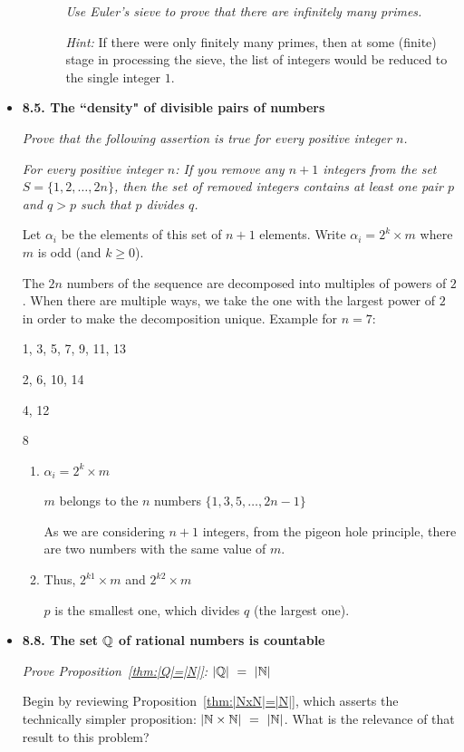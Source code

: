 \begin{itemize}
\begin{itemize}
\begin{enumerate}
\bigskip

{\em Use Euler's sieve to prove that there are infinitely many primes.}
\medskip

{\em Hint:} If there were only finitely many primes, then at some (finite) stage in processing the sieve, the list of integers would be reduced to the single integer $1$.
\end{enumerate}
\end{itemize}

 \medskip\item

{\bf 8.5. The ``density"  of divisible pairs of numbers}

{\em Prove that the following assertion is true for every positive integer $n$.}
\medskip

{\em 
For every positive integer $n$:  If you remove {\em any} $n+1$ integers from the set $S = \{ 1, 2, \ldots, 2n\}$, then the set of removed integers contains at least one pair $p$ and $q > p$ such that $p$ divides $q$.
}


\smallskip

Let $\alpha_i$ be the elements of this set of $n+1$ elements.
Write $\alpha_i = 2^k \times m$ where $m$ is odd (and $k \geq 0$).

The $2n$ numbers of the sequence are decomposed into multiples of powers of $2$.
When there are multiple ways, we take the one with the largest power of $2$ in order to make the decomposition unique.
Example for $n=7$:

1, 3, 5, 7, 9, 11, 13

2, 6, 10, 14

4, 12

8
\medskip


\begin{enumerate}
\item
 $\alpha_i = 2^k \times m$ 
 
$m$ belongs to the $n$ numbers $\{1,3,5, \ldots, 2n-1 \}$

As we are considering $n+1$ integers, from the pigeon hole principle, there are two numbers with the same value of $m$. 
\item 
Thus, $2^{k1} \times m$ and $2^{k2} \times m$

$p$ is the smallest one, which divides $q$ (the largest one).
\end{enumerate}


\medskip\item

{\bf 8.8. The set $\mathbb{Q}$ of rational numbers is countable}

{\em Prove Proposition~\ref{thm:|Q|=|N|}: $|\mathbb{Q}| \ = \ |\mathbb{N}|$}

\smallskip

Begin by reviewing Proposition~\ref{thm:|NxN|=|N|}, which asserts the technically simpler proposition: $|\mathbb{N} \times \mathbb{N}| \ = \ |\mathbb{N}|$.  What is the relevance of that result to this problem?

\end{itemize}


